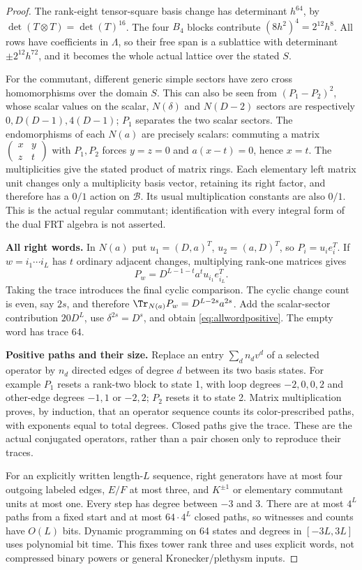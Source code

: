 \begin{proof}
The rank-eight tensor-square basis change has determinant $h^{64}$,
by $\det(T\otimes T)=\det(T)^{16}$.
The four $B_4$ blocks contribute $(8h^2)^4=2^{12}h^8$.
All rows have coefficients in $\Lambda$, so their free span is a
sublattice with determinant $\pm2^{12}h^{72}$, and it becomes the
whole actual lattice over the stated $S$.

For the commutant, different generic simple sectors have zero
cross homomorphisms over the domain $S$.
This can also be seen from $(P_1-P_2)^2$, whose scalar values
on the scalar, $N(\delta)$ and $N(D-2)$ sectors are respectively
$0,D(D-1),4(D-1)$; $P_1$ separates the two scalar sectors.
The endomorphisms of each $N(a)$ are precisely scalars:
commuting a matrix $\left(\begin{smallmatrix}x&y\\z&t\end{smallmatrix}\right)$
with $P_1,P_2$ forces $y=z=0$ and $a(x-t)=0$, hence $x=t$.
The multiplicities give the stated product of matrix rings.
Each elementary left matrix unit changes only a multiplicity basis
vector, retaining its right factor, and therefore has a $0/1$
action on $\mathcal B$. Its usual multiplication constants are
also $0/1$. This is the actual regular commutant; identification
with every integral form of the dual FRT algebra is not asserted.

\par\smallskip\noindent\textbf{All right words.}\quad
In $N(a)$ put $u_1=(D,a)^T$, $u_2=(a,D)^T$, so $P_i=u_i e_i^T$.
If $w=i_1\cdots i_L$ has $t$ ordinary adjacent changes, multiplying
rank-one matrices gives
\[
 P_w=D^{L-1-t}a^t u_{i_1}e_{i_L}^T.
\]
Taking the trace introduces the final cyclic comparison.
The cyclic change count is even, say $2s$, and therefore
$\Tr_{N(a)}P_w=D^{L-2s}a^{2s}$.
Add the scalar-sector contribution $20D^L$, use
$\delta^{2s}=D^s$, and obtain \eqref{eq:allwordpositive}.
The empty word has trace $64$.

\par\smallskip\noindent\textbf{Positive paths and their size.}\quad
Replace an entry $\sum_d n_dv^d$ of a selected operator by $n_d$
directed edges of degree $d$ between its two basis states.
For example $P_1$ resets a rank-two block to state 1, with loop
degrees $-2,0,0,2$ and other-edge degrees $-1,1$ or $-2,2$;
$P_2$ resets it to state 2. Matrix multiplication proves, by
induction, that an operator sequence counts its color-prescribed
paths, with exponents equal to total degrees. Closed paths give
the trace. These are the actual conjugated operators, rather than
a pair chosen only to reproduce their traces.

For an explicitly written length-$L$ sequence, right generators
have at most four outgoing labeled edges, $E/F$ at most three,
and $K^{\pm1}$ or elementary commutant units at most one.
Every step has degree between $-3$ and $3$.
There are at most $4^L$ paths from a fixed start and at most
$64\cdot4^L$ closed paths, so witnesses and counts have $O(L)$
bits. Dynamic programming on 64 states and degrees in $[-3L,3L]$
uses polynomial bit time. This fixes tower rank three and uses
explicit words, not compressed binary powers or general
Kronecker/plethysm inputs.
\end{proof}

